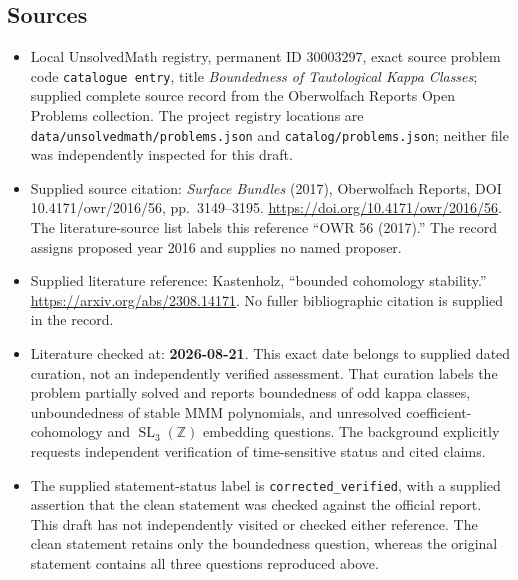 \documentclass[11pt]{article}
\newcommand{\Z}{\mathbb{Z}}
\begin{document}
\subsection{Sources}
\begin{itemize}
\item Local UnsolvedMath registry, permanent ID \(30003297\), exact source problem code \texttt{catalogue entry}, title \emph{Boundedness of Tautological Kappa Classes}; supplied complete source record from the Oberwolfach Reports Open Problems collection. The project registry locations are \texttt{data/unsolvedmath/problems.json} and \texttt{catalog/problems.json}; neither file was independently inspected for this draft.
\item Supplied source citation: \emph{Surface Bundles} (2017), Oberwolfach Reports, DOI 10.4171/owr/2016/56, pp.\ 3149--3195. \url{https://doi.org/10.4171/owr/2016/56}. The literature-source list labels this reference ``OWR 56 (2017).'' The record assigns proposed year 2016 and supplies no named proposer.
\item Supplied literature reference: Kastenholz, ``bounded cohomology stability.'' \url{https://arxiv.org/abs/2308.14171}. No fuller bibliographic citation is supplied in the record.
\item Literature checked at: \textbf{2026-08-21}. This exact date belongs to supplied dated curation, not an independently verified assessment. That curation labels the problem partially solved and reports boundedness of odd kappa classes, unboundedness of stable MMM polynomials, and unresolved coefficient-cohomology and \(\operatorname{SL}_3(\Z)\) embedding questions. The background explicitly requests independent verification of time-sensitive status and cited claims.
\item The supplied statement-status label is \texttt{corrected\_verified}, with a supplied assertion that the clean statement was checked against the official report. This draft has not independently visited or checked either reference. The clean statement retains only the boundedness question, whereas the original statement contains all three questions reproduced above.
\end{itemize}
\end{document}
